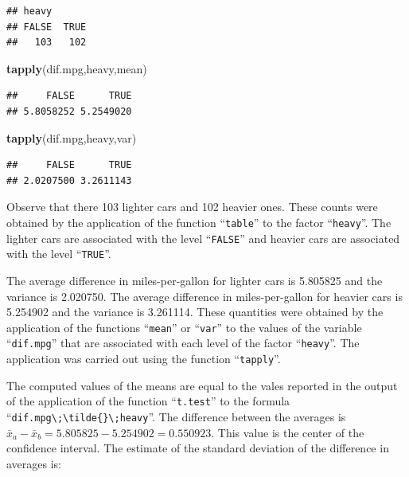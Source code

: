 \documentclass[]{krantz}
\makeatletter
\newenvironment{Shaded}{\begin{snugshade}}{\end{snugshade}}
\newcommand{\KeywordTok}[1]{\textcolor[rgb]{0.13,0.29,0.53}{\textbf{#1}}}
\newcommand{\NormalTok}[1]{#1}
\newenvironment{kframe}{%
\medskip{}
\setlength{\fboxsep}{.8em}
 \def\at@end@of@kframe{}%
 \ifinner\ifhmode%
  \def\at@end@of@kframe{\end{minipage}}%
  \begin{minipage}{\columnwidth}%
 \fi\fi%
 \def\FrameCommand##1{\hskip\@totalleftmargin \hskip-\fboxsep
 \colorbox{shadecolor}{##1}\hskip-\fboxsep
     \hskip-\linewidth \hskip-\@totalleftmargin \hskip\columnwidth}%
 \MakeFramed {\advance\hsize-\width
   \@totalleftmargin\z@ \linewidth\hsize
   \@setminipage}}%
 {\par\unskip\endMakeFramed%
 \at@end@of@kframe}
\renewenvironment{Shaded}{\begin{kframe}}{\end{kframe}}
\theoremstyle{definition}
\theoremstyle{definition}
\theoremstyle{definition}
\theoremstyle{remark}
\makeatother
\begin{document}
\begin{verbatim}
## heavy
## FALSE  TRUE 
##   103   102
\end{verbatim}

\begin{Shaded}
\begin{Highlighting}[]
\KeywordTok{tapply}\NormalTok{(dif.mpg,heavy,mean)}
\end{Highlighting}
\end{Shaded}

\begin{verbatim}
##     FALSE      TRUE 
## 5.8058252 5.2549020
\end{verbatim}

\begin{Shaded}
\begin{Highlighting}[]
\KeywordTok{tapply}\NormalTok{(dif.mpg,heavy,var)}
\end{Highlighting}
\end{Shaded}

\begin{verbatim}
##     FALSE      TRUE 
## 2.0207500 3.2611143
\end{verbatim}

Observe that there 103 lighter cars and 102 heavier ones. These counts
were obtained by the application of the function ``\texttt{table}'' to
the factor ``\texttt{heavy}''. The lighter cars are associated with the
level ``\texttt{FALSE}'' and heavier cars are associated with the level
``\texttt{TRUE}''.

The average difference in miles-per-gallon for lighter cars is 5.805825
and the variance is 2.020750. The average difference in miles-per-gallon
for heavier cars is 5.254902 and the variance is 3.261114. These
quantities were obtained by the application of the functions
``\texttt{mean}'' or ``\texttt{var}'' to the values of the variable
``\texttt{dif.mpg}'' that are associated with each level of the factor
``\texttt{heavy}''. The application was carried out using the function
``\texttt{tapply}''.

The computed values of the means are equal to the vales reported in the
output of the application of the function ``\texttt{t.test}'' to the
formula
``\texttt{dif.mpg\textbackslash{};\textbackslash{}tilde\{\}\textbackslash{};heavy}''.
The difference between the averages is
\(\bar x_a - \bar x_b = 5.805825 - 5.254902 = 0.550923\). This value is
the center of the confidence interval. The estimate of the standard
deviation of the difference in averages is:
\end{document}
